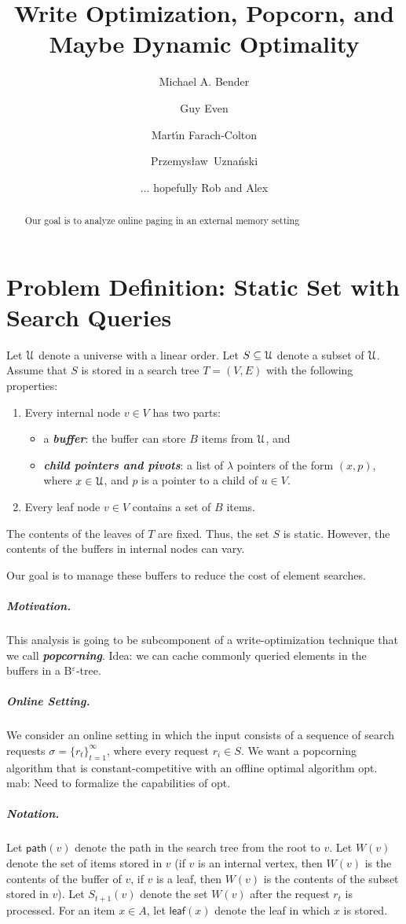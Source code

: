 \documentclass[a4paper,UKenglish]{lipics-v2016}
\title{Write Optimization, Popcorn, and Maybe Dynamic Optimality}
\author[1]{Michael A. Bender}
\author[2]{Guy Even}
\author[3]{Mart\'\i{}n Farach-Colton}
\author[4]{Przemys\l{}aw~Uzna\'nski}
\author[5]{... hopefully Rob and Alex}
\newcommand{\myboldmath}{\boldmath}
\newcommand{\defn}[1]      {{\textit{\textbf{\myboldmath #1\/}}}}
\newcommand{\mab}[1]{{\sf \scriptsize \color{red} mab: #1}}
\renewcommand{\path}{\textsf{path}}
\newcommand{\leaf}{\textsf{leaf}}
\newcommand{\calU}{{\cal U}}
\newcommand{\opt}{\mbox{\sc opt}}
\newcommand{\set}{S}
\newcommand{\buf}[1]{W(#1)}
\newcommand{\tree}{T}
\newcommand{\bet}{B$^{\varepsilon}$-tree\xspace}
\begin{document}
\maketitle

\begin{abstract}
Our goal is to analyze online paging in an external memory setting
 \end{abstract}


\section{Problem Definition: Static Set with Search Queries}
Let $\calU$ denote a universe with a linear order. 
Let $\set\subseteq \calU$ denote a subset of $\calU$.
Assume that $\set$ is stored in a search tree $\tree=(V,E)$ with the following properties:
\begin{enumerate}
\item Every internal node $v\in V$ has two parts:
  \begin{itemize}
  \item a \defn{buffer}: the buffer can store $B$ items from $\calU$, and
  \item \defn{child pointers and pivots}: a list of $\lambda$ pointers of the form $(x,p)$, where $x\in \calU$, and 
$p$ is a pointer to a child of $u\in V$.
  \end{itemize}
\item Every leaf node $v\in V$ contains a set of $B$ items.
\end{enumerate}
The contents of the leaves of $\tree$ are fixed. Thus, the set  $\set$ is static. 
However, the contents of the buffers in internal nodes can vary.  

Our goal is to manage these buffers to reduce the cost of element searches.

\subparagraph*{Motivation.} This analysis is going to be subcomponent of a write-optimization technique that we call \defn{popcorning}.
Idea: we can cache commonly queried elements in the buffers in a \bet.

\subparagraph*{Online Setting.}
We consider an online setting in which the input consists of a sequence of search requests 
$\sigma=\{r_t\}_{t=1}^{\infty}$, where every request $r_i\in\set$. We want a popcorning algorithm that is constant-competitive with an offline optimal algorithm \opt. \mab{Need to formalize the capabilities of \opt.}

\subparagraph*{Notation.} Let $\path(v)$ denote the path in the search tree from the root to $v$.
Let $\buf{v}$ denote the set of items stored in $v$ (if $v$ is an internal vertex, then $\buf{v}$ is the contents of the buffer of $v$, if $v$ is a leaf, then $\buf{v}$ is the contents of the subset stored in $v$). 
Let $S_{t+1}(v)$ denote the set $\buf{v}$ after the request $r_t$ is processed. 
For an item $x\in A$, let $\leaf(x)$ denote the leaf in which $x$ is stored. 
\end{document}
